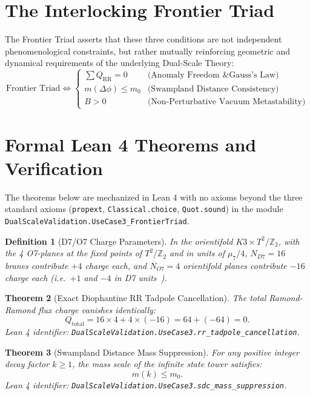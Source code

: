 \documentclass[11pt,a4paper]{article}
\newtheorem{theorem}{Theorem}
\newtheorem{definition}[theorem]{Definition}
\begin{document}
\section{The Interlocking Frontier Triad}
The Frontier Triad asserts that these three conditions are not independent phenomenological constraints, but rather mutually reinforcing geometric and dynamical requirements of the underlying Dual-Scale Theory:
\begin{equation}
    \text{Frontier Triad} \iff \begin{cases}
        \sum Q_{\mathrm{RR}} = 0 & \text{(Anomaly Freedom \& Gauss's Law)} \\
        m(\Delta\phi) \le m_0 & \text{(Swampland Distance Consistency)} \\
        B > 0 & \text{(Non-Perturbative Vacuum Metastability)}
    \end{cases}
\end{equation}

\section{Formal Lean 4 Theorems and Verification}
The theorems below are mechanized in Lean 4 with no axioms beyond the three standard axioms (\texttt{propext}, \texttt{Classical.choice}, \texttt{Quot.sound}) in the module \texttt{DualScaleValidation.UseCase3\_FrontierTriad}.

\begin{definition}[D7/O7 Charge Parameters]\label{def:charges}
In the orientifold $K3 \times T^2/\mathbb{Z}_2$, with the 4 O7-planes at the fixed points of $T^2/\mathbb{Z}_2$ and in units of $\mu_7/4$, $N_{D7} = 16$ branes contribute $+4$ charge each, and $N_{O7} = 4$ orientifold planes contribute $-16$ charge each (i.e.\ $+1$ and $-4$ in D7 units~\cite{Sen1996,TripathyTrivedi2003}).
\end{definition}

\begin{theorem}[Exact Diophantine RR Tadpole Cancellation]
The total Ramond-Ramond flux charge vanishes identically:
\begin{equation}
    Q_{\mathrm{total}} = 16 \times 4 + 4 \times (-16) = 64 + (-64) = 0.
\end{equation}
\textit{Lean 4 identifier:} \texttt{DualScaleValidation.UseCase3.rr\_tadpole\_cancellation}.
\end{theorem}

\begin{theorem}[Swampland Distance Mass Suppression]
For any positive integer decay factor $k \ge 1$, the mass scale of the infinite state tower satisfies:
\begin{equation}
    m(k) \le m_0.
\end{equation}
\textit{Lean 4 identifier:} \texttt{DualScaleValidation.UseCase3.sdc\_mass\_suppression}.
\end{theorem}
\end{document}
